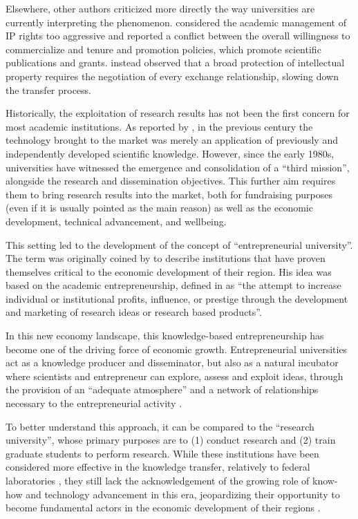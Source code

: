 Elsewhere, other authors criticized more directly the way universities are currently interpreting the phenomenon. \citet{Siegel2003a} considered the academic management of IP rights too aggressive and reported a conflict between the overall willingness to commercialize and tenure and promotion policies, which promote scientific publications and grants. \citet{Murray2005} instead observed that a broad protection of intellectual property requires the negotiation of every exchange relationship, slowing down the transfer process.

Historically, the exploitation of research results has not been the first concern for most academic institutions. As reported by \citet{Balconi2006}, in the previous century the technology brought to the market was merely an application of previously and independently developed scientific knowledge. However, since the early 1980s, universities have witnessed the emergence and consolidation of a \enquote{third mission}, alongside the research and dissemination objectives. This further aim requires them to bring research results into the market, both for fundraising purposes (even if it is usually pointed as the main reason) as well as the economic development, technical advancement, and wellbeing. 

This setting led to the development of the concept of \enquote{entrepreneurial university}. The term was originally coined by \citet{Etzkowitz1998} to describe institutions that have proven themselves critical to the economic development of their region. His idea was based on the academic entrepreneurship, defined in \citet{Louis1989} as \enquote{the attempt to increase individual or institutional profits, influence, or prestige through the development and marketing of research ideas or research based products}.

In this new economy landscape, this knowledge-based entrepreneurship has become one of the driving force of economic growth. Entrepreneurial universities act as a knowledge producer and disseminator, but also as a natural incubator where scientists and entrepreneur can explore, assess and exploit ideas, through the provision of an \enquote{adequate atmosphere} and a network of relationships necessary to the entrepreneurial activity \citep{Guerrero2014}.

To better understand this approach, it can be compared to the \enquote{research university}, whose primary purposes are to (1) conduct research and (2) train graduate students to perform research. While these institutions have been considered more effective in the knowledge transfer, relatively to federal laboratories \citep{Rogers2001}, they still lack the acknowledgement of the growing role of know-how and technology advancement in this era, jeopardizing their opportunity to become fundamental actors in the economic development of their regions \citep{OShea2004}.

